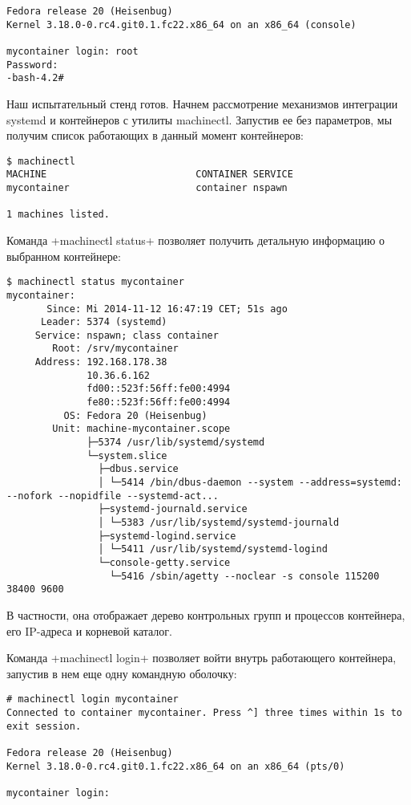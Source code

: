 \documentclass[10pt,oneside,a4paper]{article}
\begin{document}
\begin{Verbatim}[fontsize=\small]
Fedora release 20 (Heisenbug)
Kernel 3.18.0-0.rc4.git0.1.fc22.x86_64 on an x86_64 (console)

mycontainer login: root
Password:
-bash-4.2#
\end{Verbatim}

Наш испытательный стенд готов. Начнем рассмотрение механизмов интеграции systemd
и контейнеров с утилиты machinectl. Запустив ее без параметров, мы получим
список работающих в данный момент контейнеров:
\begin{Verbatim}
$ machinectl
MACHINE                          CONTAINER SERVICE
mycontainer                      container nspawn

1 machines listed.
\end{Verbatim}

Команда +machinectl status+ позволяет получить детальную информацию о выбранном
контейнере:
\begin{Verbatim}[fontsize=\small]
$ machinectl status mycontainer
mycontainer:
       Since: Mi 2014-11-12 16:47:19 CET; 51s ago
      Leader: 5374 (systemd)
     Service: nspawn; class container
        Root: /srv/mycontainer
     Address: 192.168.178.38
              10.36.6.162
              fd00::523f:56ff:fe00:4994
              fe80::523f:56ff:fe00:4994
          OS: Fedora 20 (Heisenbug)
        Unit: machine-mycontainer.scope
              ├─5374 /usr/lib/systemd/systemd
              └─system.slice
                ├─dbus.service
                │ └─5414 /bin/dbus-daemon --system --address=systemd: --nofork --nopidfile --systemd-act...
                ├─systemd-journald.service
                │ └─5383 /usr/lib/systemd/systemd-journald
                ├─systemd-logind.service
                │ └─5411 /usr/lib/systemd/systemd-logind
                └─console-getty.service
                  └─5416 /sbin/agetty --noclear -s console 115200 38400 9600
\end{Verbatim}
В частности, она отображает дерево контрольных групп и процессов контейнера, его
IP-адреса и корневой каталог.

Команда +machinectl login+ позволяет войти внутрь работающего контейнера,
запустив в нем еще одну командную оболочку:
\begin{Verbatim}
# machinectl login mycontainer
Connected to container mycontainer. Press ^] three times within 1s to exit session.

Fedora release 20 (Heisenbug)
Kernel 3.18.0-0.rc4.git0.1.fc22.x86_64 on an x86_64 (pts/0)

mycontainer login:
\end{Verbatim}
\end{document}
